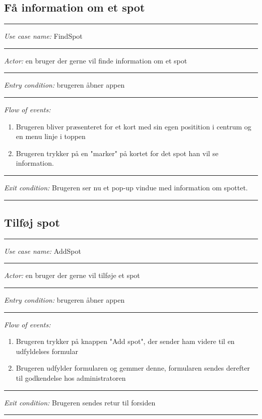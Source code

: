 \documentclass[12pt]{article}
\begin{document}
\subsection*{Få information om et spot}
\hrule\vspace{5mm}
\textit{Use case name:} FindSpot\\
\hrule\vspace{5mm}
\textit{Actor:} en bruger der gerne vil finde information om et spot\\
\hrule\vspace{5mm}
\textit{Entry condition:} brugeren åbner appen\\
\hrule\vspace{5mm}
\textit{Flow of events:}
\begin{enumerate}
\item Brugeren bliver præsenteret for et kort med sin egen positition i centrum og en menu linje i toppen
\item Brugeren trykker på en "marker" på kortet for det spot han vil se information.
\end{enumerate}
\hrule\vspace{5mm}
\textit{Exit condition:} Brugeren ser nu et pop-up vindue med information om spottet.\\
\hrule\vspace{5mm}
\newpage
\subsection*{Tilføj spot}
\hrule\vspace{5mm}
\textit{Use case name:} AddSpot\\
\hrule\vspace{5mm}
\textit{Actor:} en bruger der gerne vil tilføje et spot\\
\hrule\vspace{5mm}
\textit{Entry condition:} brugeren åbner appen\\
\hrule\vspace{5mm}
\textit{Flow of events:}
\begin{enumerate}
\item Brugeren trykker på knappen "Add spot", der sender ham videre til en udfyldelses formular
\item Brugeren udfylder formularen og gemmer denne, formularen sendes derefter til godkendelse hos administratoren
\end{enumerate}
\hrule\vspace{5mm}
\textit{Exit condition:} Brugeren sendes retur til forsiden\\
\hrule\vspace{5mm}
\newpage
\end{document}
